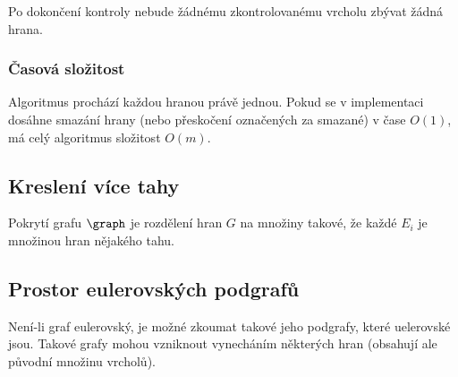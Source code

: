 Po dokončení kontroly nebude žádnému zkontrolovanému vrcholu zbývat žádná hrana.

\subsubsection{Časová složitost}

Algoritmus prochází každou hranou právě jednou.
Pokud se v implementaci dosáhne smazání hrany (nebo přeskočení označených za smazané) v čase $O(1)$, má celý algoritmus složitost $O(m)$.

\label{lemma:eulerovsky-tah-slozitost}

\subsection{Kreslení více tahy}

Pokrytí grafu $\graph$ je rozdělení hran $G$ na množiny  takové, že každé $E_i$ je množinou hran nějakého tahu.

\label{lemma:pocet-otevrenych-tahu}


\subsection{Prostor eulerovských podgrafů}

Není-li graf eulerovský, je možné zkoumat takové jeho podgrafy, které uelerovské jsou.
Takové grafy mohou vzniknout vynecháním některých hran (obsahují ale původní množinu vrcholů).



\label{lemma:eulerovske-mnoziny}
